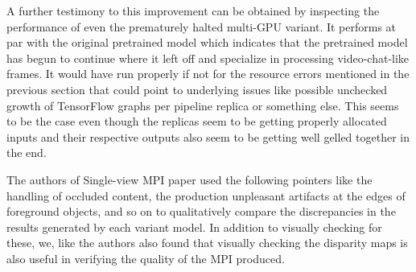 A further testimony to this improvement can be obtained by inspecting the performance of even the prematurely halted multi-GPU variant. It performs at par with the original pretrained model which indicates that the pretrained model has begun to continue where it left off and specialize in processing video-chat-like frames. It would have run properly if not for the resource errors mentioned in the previous section that could point to underlying issues like possible unchecked growth of TensorFlow graphs per pipeline replica or something else. This seems to be the case even though the replicas seem to be getting properly allocated inputs and their respective outputs also seem to be getting well gelled together in the end.

The authors of Single-view MPI paper used the following pointers like the handling of occluded content, the production unpleasant artifacts at the edges of foreground objects, and so on to qualitatively compare the discrepancies in the results generated by each variant model. In addition to visually checking for these, we, like the authors also found that visually checking the disparity maps is also useful in verifying the quality of the MPI produced.   

